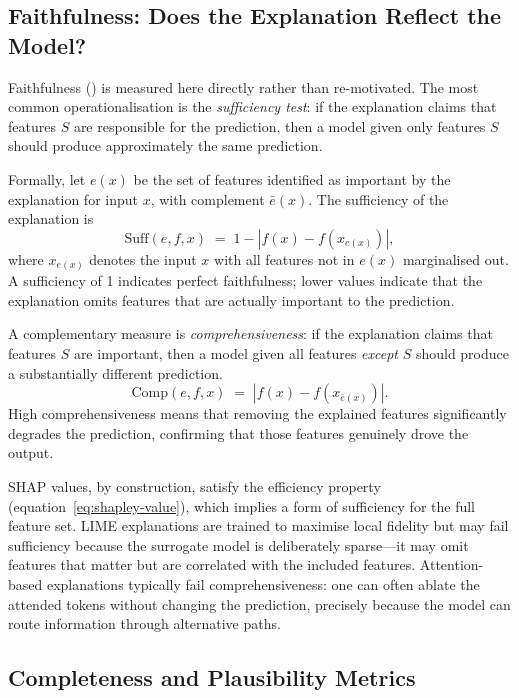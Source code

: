 \subsection{Faithfulness: Does the Explanation Reflect the Model?}
\label{sec:ch12-faithfulness}

Faithfulness () is measured here directly rather than
re-motivated. The most common operationalisation is the \emph{sufficiency test}: if the
explanation claims that features $S$ are responsible for the prediction, then a model
given only features $S$ should produce approximately the same prediction.

Formally, let $e(x)$ be the set of features identified as important by the explanation
for input $x$, with complement $\bar{e}(x)$. The sufficiency of the explanation is
\begin{equation}
\label{eq:sufficiency}
\text{Suff}(e, f, x) \;=\; 1 - |f(x) - f(x_{e(x)})|,
\end{equation}
where $x_{e(x)}$ denotes the input $x$ with all features not in $e(x)$ marginalised out.
A sufficiency of 1 indicates perfect faithfulness; lower values indicate that the
explanation omits features that are actually important to the prediction.

A complementary measure is \emph{comprehensiveness}: if the explanation claims that
features $S$ are important, then a model given all features \emph{except} $S$ should
produce a substantially different prediction.
\begin{equation}
\label{eq:comprehensiveness}
\text{Comp}(e, f, x) \;=\; |f(x) - f(x_{\bar{e}(x)})|.
\end{equation}
High comprehensiveness means that removing the explained features significantly degrades
the prediction, confirming that those features genuinely drove the output.

SHAP values, by construction, satisfy the efficiency property (equation~\eqref{eq:shapley-value}),
which implies a form of sufficiency for the full feature set. LIME explanations are
trained to maximise local fidelity but may fail sufficiency because the surrogate model
is deliberately sparse---it may omit features that matter but are correlated with the
included features. Attention-based explanations typically fail comprehensiveness: one can
often ablate the attended tokens without changing the prediction, precisely because the
model can route information through alternative paths.

\subsection{Completeness and Plausibility Metrics}
\label{sec:ch12-completeness-plausibility}

